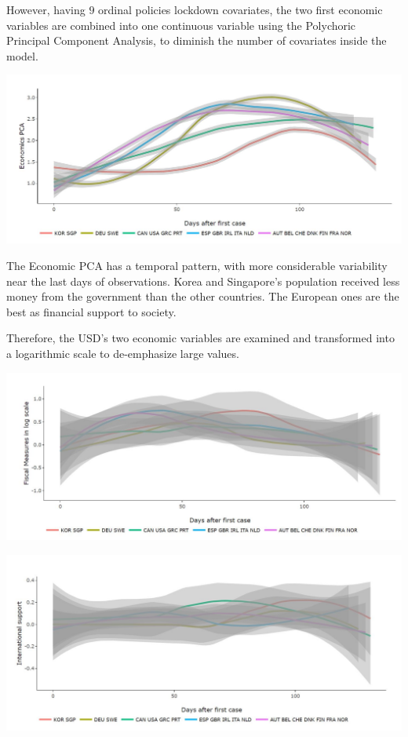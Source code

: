 \documentclass[
  6pt,
]{article}
\begin{document}
However, having \(9\) ordinal policies lockdown covariates, the two
first economic variables are combined into one continuous variable using
the Polychoric Principal Component Analysis, to diminish the number of
covariates inside the model.
\begin{center}
\includegraphics[width=\textwidth]{Report_SC_Group3_files/figure-latex/fig1.jpg}
\end{center}
The Economic PCA has a temporal pattern, with more considerable
variability near the last days of observations. Korea and Singapore's
population received less money from the government than the other
countries. The European ones are the best as financial support to
society.

Therefore, the USD's two economic variables are examined and transformed
into a logarithmic scale to de-emphasize large values.
\begin{center}
\includegraphics[width=\textwidth]{Report_SC_Group3_files/figure-latex/fig2.jpg}

\includegraphics[width=\textwidth]{Report_SC_Group3_files/figure-latex/fig3.jpg}
\end{center}
\end{document}
